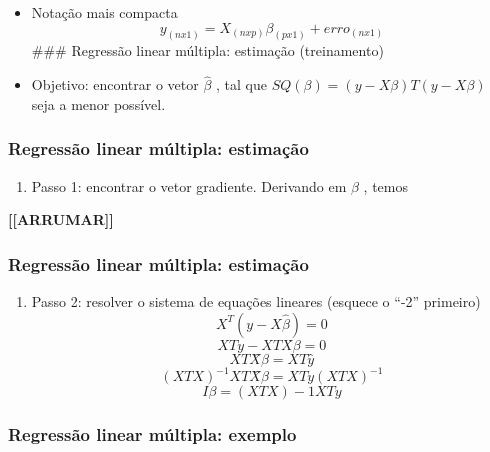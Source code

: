 \documentclass[
]{article}
\providecommand{\tightlist}{%
  \setlength{\itemsep}{0pt}\setlength{\parskip}{0pt}}
\begin{document}
\begin{itemize}
\tightlist
\item
  Notação mais compacta \[
  y_{(n x  1)} = X_{(n x  p)} \beta_{(p x  1)} + erro_{(n x  1)}
  \] \#\#\# Regressão linear múltipla: estimação (treinamento)
\item
  Objetivo: encontrar o vetor \(\hat{\beta}\) , tal que
  \(S Q (\beta ) = (y - X\beta )T(y - X\beta )\) seja a menor possível.
\end{itemize}

\hypertarget{regressuxe3o-linear-muxfaltipla-estimauxe7uxe3o}{%
\subsubsection{Regressão linear múltipla:
estimação}\label{regressuxe3o-linear-muxfaltipla-estimauxe7uxe3o}}

\begin{enumerate}
\def\labelenumi{\arabic{enumi}.}
\tightlist
\item
  Passo 1: encontrar o vetor gradiente. Derivando em \(\beta\) , temos
\end{enumerate}

\textbf{{[}{[}ARRUMAR{]}{]}}

\hypertarget{regressuxe3o-linear-muxfaltipla-estimauxe7uxe3o-1}{%
\subsubsection{Regressão linear múltipla:
estimação}\label{regressuxe3o-linear-muxfaltipla-estimauxe7uxe3o-1}}

\begin{enumerate}
\def\labelenumi{\arabic{enumi}.}
\setcounter{enumi}{1}
\tightlist
\item
  Passo 2: resolver o sistema de equações lineares (esquece o ``-2''
  primeiro) \[ X^{T} (y - X\hat{\beta}) = 0\] \[XTy - XTX̂\beta  = 0\]
  \[XTX̂\beta  = XTŷ\] \[(XTX)^{-1}  XTX̂\beta  = XTy (XTX)^{-1}\]
  \[ I\beta  = (XTX)-1XTy \]
\end{enumerate}

\hypertarget{regressuxe3o-linear-muxfaltipla-exemplo}{%
\subsubsection{Regressão linear múltipla:
exemplo}\label{regressuxe3o-linear-muxfaltipla-exemplo}}
\end{document}
